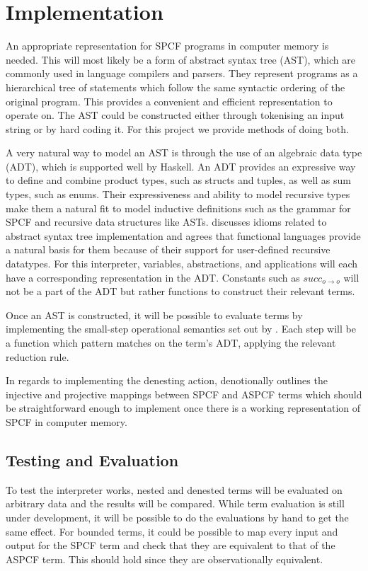 \documentclass[12pt,a4paper]{report}
\theoremstyle{definition}
\theoremstyle{remark}
\begin{document}
\section{Implementation}\label{section: lit-review-impl}
An appropriate representation for SPCF programs in computer memory is needed. This will most likely be a form of abstract syntax tree (AST), which are commonly used in language compilers and parsers. They represent programs as a hierarchical tree of statements which follow the same syntactic ordering of the original program. This provides a convenient and efficient representation to operate on. The AST could be constructed either through tokenising an input string or by hard coding it. For this project we provide methods of doing both.

A very natural way to model an AST is through the use of an algebraic data type (ADT), which is supported well by Haskell. An ADT provides an expressive way to define and combine product types, such as structs and tuples, as well as sum types, such as enums. Their expressiveness and ability to model recursive types make them a natural fit to model inductive definitions such as the grammar for SPCF and recursive data structures like ASTs. \cite{jones_2003} discusses idioms related to abstract syntax tree implementation and agrees that functional languages provide a natural basis for them because of their support for user-defined recursive datatypes. For this interpreter, variables, abstractions, and applications will each have a corresponding representation in the ADT. Constants such as $succ_{o \rightarrow o}$ will not be a part of the ADT but rather functions to construct their relevant terms.

Once an AST is constructed, it will be possible to evaluate terms by implementing the small-step operational semantics set out by \cite{laird_2007}. Each step will be a function which pattern matches on the term's ADT, applying the relevant reduction rule.

In regards to implementing the denesting action, \cite{laird_2007} denotionally outlines the injective and projective mappings between SPCF and ASPCF terms which should be straightforward enough to implement once there is a working representation of SPCF in computer memory. 

\subsection{Testing and Evaluation}
To test the interpreter works, nested and denested terms will be evaluated on arbitrary data and the results will be compared. While term evaluation is still under development, it will be possible to do the evaluations by hand to get the same effect. For bounded terms, it could be possible to map every input and output for the SPCF term and check that they are equivalent to that of the ASPCF term. This should hold since they are observationally equivalent. 
\end{document}
